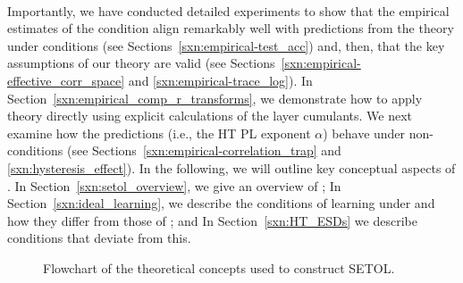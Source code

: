 \\
Importantly, we have conducted detailed experiments to show 
that the empirical estimates of the \SETOL \TRACELOG condition align remarkably well with predictions from the \HTSR
theory under \Ideal conditions (see Sections~\ref{sxn:empirical-test_acc}) and, then, 
that the key assumptions of our \SETOL theory are valid
(see Sections~\ref{sxn:empirical-effective_corr_space} and \ref{sxn:empirical-trace_log}).
In Section~\ref{sxn:empirical_comp_r_transforms}, we demonstrate how to apply theory directly using explicit calculations of the \RMT layer cumulants.
We next examine how the \HTSR predictions (i.e., the HT PL exponent $\alpha$) behave under non-\Ideal conditions (see Sections~\ref{sxn:empirical-correlation_trap} and \ref{sxn:hysteresis_effect}).
%
In the following, we will outline key conceptual aspects of \SETOL.
In Section~\ref{sxn:setol_overview}, we give an overview of \SETOL;
In Section~\ref{sxn:ideal_learning}, we describe the conditions of \Ideal learning under \SETOL and how they differ from those of \HTSR; and
In Section~\ref{sxn:HT_ESDs} we describe conditions that deviate from this.

\begin{figure}[htbp]                 %
  \centering
  \scalebox{0.75}{}   %

  \caption{Flowchart of the theoretical concepts used to construct SETOL.}
  \label{fig:cetl-flow}
\end{figure}



